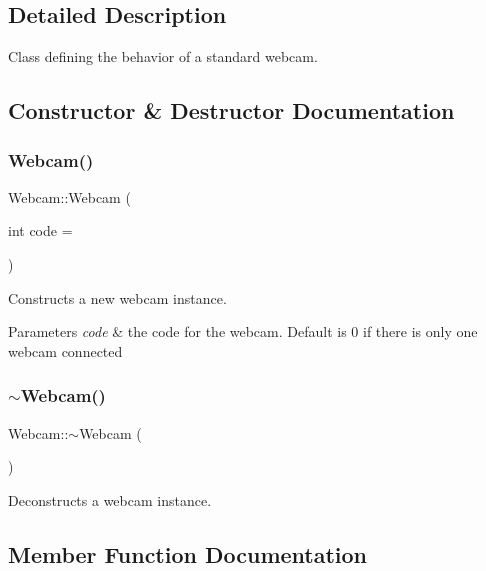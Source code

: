 \subsection{Detailed Description}
Class defining the behavior of a standard webcam. 

\subsection{Constructor \& Destructor Documentation}
\hypertarget{class_webcam_ae3694760a88e8975940045ec8d4c27ed}{}\label{class_webcam_ae3694760a88e8975940045ec8d4c27ed} 
\subsubsection{\texorpdfstring{Webcam()}{Webcam()}}
{\footnotesize\ttfamily Webcam\+::\+Webcam (\begin{DoxyParamCaption}\item[{int}]{code = {} }\end{DoxyParamCaption})}



Constructs a new webcam instance. 


\begin{DoxyParams}{Parameters}
{\em code} & the code for the webcam. Default is 0 if there is only one webcam connected \\
\hline
\end{DoxyParams}
\hypertarget{class_webcam_a573d188c6505287dadb895b1ee7526b9}{}\label{class_webcam_a573d188c6505287dadb895b1ee7526b9} 
\subsubsection{\texorpdfstring{$\sim$\+Webcam()}{~Webcam()}}
{\footnotesize\ttfamily Webcam\+::$\sim$\+Webcam (\begin{DoxyParamCaption}{ }\end{DoxyParamCaption})}



Deconstructs a webcam instance. 



\subsection{Member Function Documentation}
\hypertarget{class_webcam_a3d5cab0a2b87b90b85793bc05414e503}{}\label{class_webcam_a3d5cab0a2b87b90b85793bc05414e503} 
